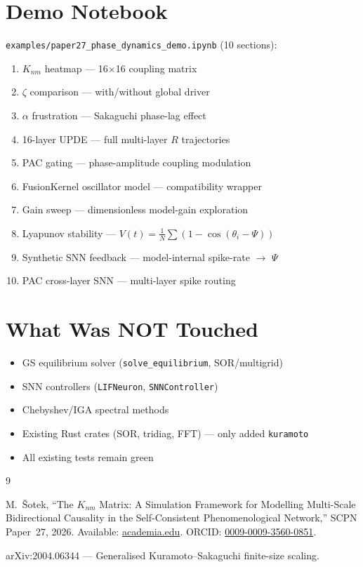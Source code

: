 \documentclass[11pt,a4paper]{article}
\begin{document}
\section{Demo Notebook}

\texttt{examples/paper27\_phase\_dynamics\_demo.ipynb} (10 sections):

\begin{enumerate}
  \item $K_{nm}$ heatmap --- 16$\times$16 coupling matrix
  \item $\zeta$ comparison --- with/without global driver
  \item $\alpha$ frustration --- Sakaguchi phase-lag effect
  \item 16-layer UPDE --- full multi-layer $R$ trajectories
  \item PAC gating --- phase-amplitude coupling modulation
  \item FusionKernel oscillator model --- compatibility wrapper
  \item Gain sweep --- dimensionless model-gain exploration
  \item Lyapunov stability --- $V(t) = \frac{1}{N}\sum(1-\cos(\theta_i-\Psi))$
  \item Synthetic SNN feedback --- model-internal spike-rate $\to$ $\Psi$
  \item PAC cross-layer SNN --- multi-layer spike routing
\end{enumerate}


\section{What Was NOT Touched}

\begin{itemize}
  \item GS equilibrium solver (\texttt{solve\_equilibrium}, SOR/multigrid)
  \item SNN controllers (\texttt{LIFNeuron}, \texttt{SNNController})
  \item Chebyshev/IGA spectral methods
  \item Existing Rust crates (SOR, tridiag, FFT) --- only added \texttt{kuramoto}
  \item All existing tests remain green
\end{itemize}


\begin{thebibliography}{9}

M.~\v{S}otek,
``The $K_{nm}$ Matrix: A Simulation Framework for Modelling Multi-Scale
Bidirectional Causality in the Self-Consistent Phenomenological Network,''
SCPN Paper~27, 2026.
Available: \href{https://www.academia.edu/143833534/27_SCPN_The_Knm_Matrix}{academia.edu}.
ORCID: \href{https://orcid.org/0009-0009-3560-0851}{0009-0009-3560-0851}.

arXiv:2004.06344 --- Generalised Kuramoto--Sakaguchi finite-size scaling.

\end{thebibliography}
\end{document}
